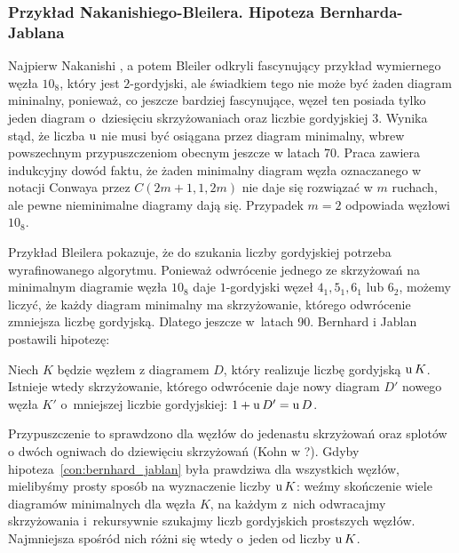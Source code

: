 
\subsubsection{Przykład Nakanishiego-Bleilera. Hipoteza Bernharda-Jablana}
Najpierw Nakanishi \cite{nakanishi1983}, a potem Bleiler \cite{bleiler1984} odkryli fascynujący przykład wymiernego węzła $10_8$, który jest $2$-gordyjski, ale świadkiem tego nie może być żaden diagram mininalny, ponieważ, co jeszcze bardziej fascynujące, węzeł ten posiada tylko jeden diagram o~dziesięciu skrzyżowaniach oraz liczbie gordyjskiej 3.
%
%
%
Wynika stąd, że liczba $\operatorname{u}$ nie musi być osiągana przez diagram minimalny, wbrew powszechnym przypuszczeniom obecnym jeszcze w latach 70.
Praca \cite{bernhard1994} zawiera indukcyjny dowód faktu, że żaden minimalny diagram węzła oznaczanego w notacji Conwaya przez $C(2m+1, 1, 2m)$ nie daje się rozwiązać w $m$ ruchach, ale pewne nieminimalne diagramy dają się.
Przypadek $m = 2$ odpowiada węzłowi $10_8$.

Przykład Bleilera pokazuje, że do szukania liczby gordyjskiej potrzeba wyrafinowanego algorytmu.
Ponieważ odwrócenie jednego ze skrzyżowań na minimalnym diagramie węzła $10_8$ daje $1$-gordyjski węzeł $4_1, 5_1, 6_1$ lub $6_2$, możemy liczyć, że każdy diagram minimalny ma skrzyżowanie, którego odwrócenie zmniejsza liczbę gordyjską.
Dlatego jeszcze w~latach 90. Bernhard \cite{bernhard1994} i Jablan \cite{jablan1998} postawili hipotezę:

\begin{conjecture}
%
%
%
\label{con:bernhard_jablan}%
    Niech $K$ będzie węzłem z diagramem $D$, który realizuje liczbę gordyjską $\operatorname{u} K$.
    Istnieje wtedy skrzyżowanie, którego odwrócenie daje nowy diagram $D'$ nowego węzła $K'$ o~mniejszej liczbie gordyjskiej: $1 + \operatorname{u} D' = \operatorname{u} D$.
\end{conjecture}

Przypuszczenie to sprawdzono dla węzłów do jedenastu skrzyżowań oraz splotów o dwóch ogniwach do dziewięciu skrzyżowań (Kohn w \cite{kohn1993}?).
%
Gdyby hipoteza~\ref{con:bernhard_jablan} była prawdziwa dla wszystkich węzłów, mielibyśmy prosty sposób na wyznaczenie liczby $\operatorname{u} K$: weźmy skończenie wiele diagramów minimalnych dla węzła $K$, na każdym z~nich odwracajmy skrzyżowania i~rekursywnie szukajmy liczb gordyjskich prostszych węzłów.
Najmniejsza spośród nich różni się wtedy o~jeden od liczby $\operatorname{u} K$.

